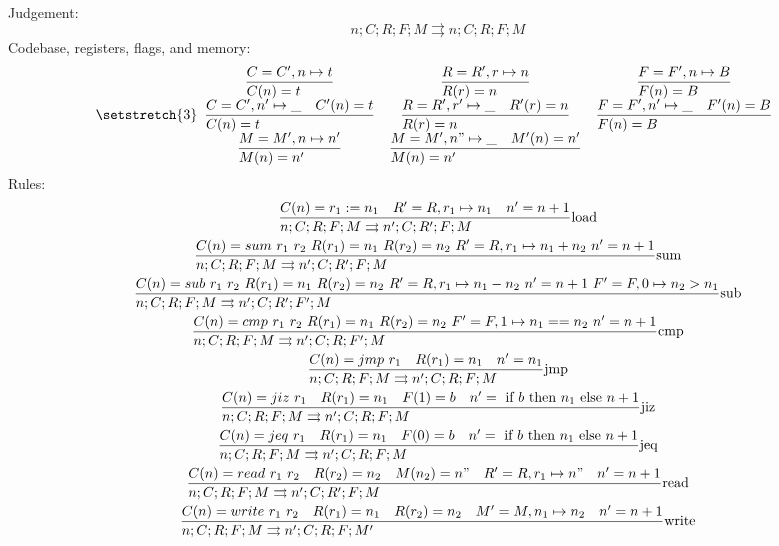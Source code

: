\documentclass{article}
\newcommand{\execs}[0]{\ensuremath{\rightrightarrows}}
\begin{document}
Judgement:
\begin{equation*}
    n;C;R;F;M \rightrightarrows n;C;R;F;M
\end{equation*}
Codebase, registers, flags, and memory:
\[\setstretch{3} \begin{array}{cccc}
    \st[]{C(n)=t}{C=C',n\mapsto t} &
    \st[]{R(r)=n}{R=R',r\mapsto n} &
    \st[]{F(n)=B}{F=F',n\mapsto B} \\
    \st[]{C(n)=t}{C=C',n'\mapsto \_\quad C'(n)=t} &
    \st[]{R(r)=n}{R=R',r'\mapsto \_\quad R'(r)=n} &
    \st[]{F(n)=B}{F=F',n'\mapsto \_\quad F'(n)=B} \\
    \st[]{M(n)=n'}{M=M',n\mapsto n'} &
    \st[]{M(n)=n'}{M=M',n"\mapsto \_\quad M'(n)=n'} \\
\end{array}\]
Rules:
\begin{gather*}
    \st[load]{n;C;R;F;M \execs n';C;R';F;M}{C(n)=r_1:=n_1 \quad R'=R,r_1\mapsto n_1 \quad n'=n+1} \\
    \st[sum]{n;C;R;F;M \execs n';C;R';F;M}{
        C(n)=sum\ r_1\ r_2 \ 
        R(r_1)=n_1 \ 
        R(r_2)=n_2 \ 
        R'=R,r_1\mapsto n_1+n_2 \ 
        n'=n+1
    } \\
    \st[sub]{n;C;R;F;M \execs n';C;R';F';M}{
        C(n)=sub\ r_1\ r_2 \ 
        R(r_1)=n_1 \ 
        R(r_2)=n_2 \ 
        R'=R,r_1\mapsto n_1-n_2 \ 
        n'=n+1 \
        F'=F,0\mapsto n_2>n_1
    } \\
    \st[cmp]{n;C;R;F;M \execs n';C;R;F';M}{
        C(n)=cmp\ r_1\ r_2 \ 
        R(r_1)=n_1 \ 
        R(r_2)=n_2 \ 
        F'=F,1\mapsto n_1==n_2 \
        n'=n+1
    } \\
    \st[jmp]{n;C;R;F;M \execs n';C;R;F;M}{
        C(n)=jmp\ r_1 \quad
        R(r_1)=n_1 \quad
        n'=n_1
    } \\
    \st[jiz]{n;C;R;F;M \execs n';C;R;F;M}{
        C(n)=jiz\ r_1 \quad
        R(r_1)=n_1 \quad
        F(1)=b \quad
        n'=\IF b \THEN n_1 \ELSE n+1
    } \\
    \st[jeq]{n;C;R;F;M \execs n';C;R;F;M}{
        C(n)=jeq\ r_1 \quad
        R(r_1)=n_1 \quad
        F(0)=b \quad
        n'=\IF b \THEN n_1 \ELSE n+1
    } \\
    \st[read]{n;C;R;F;M \execs n';C;R';F;M}{
        C(n)=read\ r_1\ r_2 \quad
        R(r_2)=n_2 \quad
        M(n_2) = n" \quad
        R' = R,r_1\mapsto n" \quad
        n'=n+1
    } \\
    \st[write]{n;C;R;F;M \execs n';C;R;F;M'}{
        C(n)=write\ r_1\ r_2 \quad
        R(r_1)=n_1 \quad
        R(r_2)=n_2 \quad
        M' = M,n_1\mapsto n_2 \quad
        n'=n+1
    }
\end{gather*}
\end{document}
